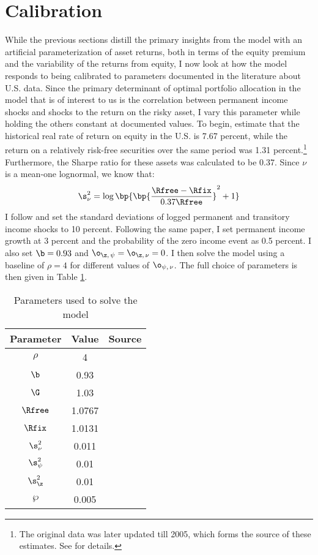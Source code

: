 \section{Calibration}\label{us_data}

While the previous sections distill the primary insights from the model with an artificial parameterization of asset returns, both in terms of the equity premium and the variability of the returns from equity, I now look at how the model responds to being calibrated to parameters documented in the literature about U.S. data. Since the primary determinant of optimal portfolio allocation in the model that is of interest to us is the correlation between permanent income shocks and shocks to the return on the risky asset, I vary this parameter while holding the others constant at documented values. To begin, \citet{Mehra1985} estimate that the historical real rate of return on equity in the U.S. is 7.67 percent, while the return on a relatively risk-free securities over the same period was 1.31 percent.\footnote{The original data was later updated till 2005, which forms the source of these estimates. See \citet{Mehra2006} for details.} Furthermore, the Sharpe ratio for these assets was calculated to be 0.37. Since $\nu$ is a mean-one lognormal, we know that:
\[
\s_{\nu}^2 = \log\bp{\bp{\frac{\Rfree - \Rfix}{0.37\Rfree}}^2 + 1}
\]
I follow \citet{Carroll1992} and set the standard deviations of logged permanent and transitory income shocks to 10 percent. Following the same paper, I set permanent income growth at 3 percent and the probability of the zero income event as 0.5 percent. I also set $\b = 0.93$ and $\o_{\z,\,\psi} = \o_{\z,\,\nu} = 0$. I then solve the model using a baseline of $\rho = 4$ for different values of $\o_{\psi,\,\nu}$. The full choice of parameters is then given in Table \ref{tab:model_parameters}.

\begin{table}[htbp]
    \begin{tabular}{ccc}
        \toprule
        Parameter & Value & Source\\
        \midrule
        $\rho$ & 4\\
        $\b$ & 0.93\\
        $\G$ & 1.03 & \citet{Carroll1992}\\
        $\Rfree$ & 1.0767 & \citet{Mehra2006}\\
        $\Rfix$ & 1.0131 & \citet{Mehra2006}\\
        $\s_{\nu}^2$ & 0.011 & \citet{Mehra2006}\\
        $\s_{\psi}^2$ & 0.01 & \citet{Carroll1992}\\
        $\s_{\z}^2$ & 0.01 & \citet{Carroll1992}\\
        $\wp$ & 0.005 & \citet{Carroll1992}\\
        \bottomrule
    \end{tabular}
    \caption{Parameters used to solve the model}
    \label{tab:model_parameters}
\end{table}

